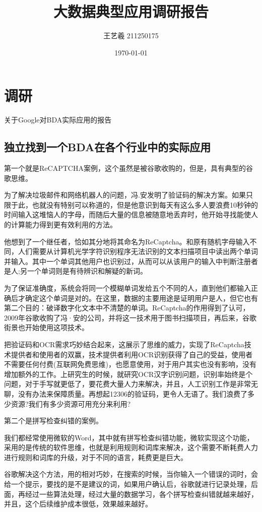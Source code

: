 \documentclass{article}
\title{大数据典型应用调研报告}
\author{王艺羲 211250175}
\date{\today}
\begin{document}
\maketitle

\section{调研}
关于Google对BDA实际应用的报告
\subsection{独立找到一个BDA在各个行业中的实际应用}
第一个就是ReCAPTCHA案例，这个虽然是被谷歌收购的，但是，具有典型的谷歌思维。

为了解决垃圾邮件和网络机器人的问题，冯.安发明了验证码的解决方案。如果只限于此，也就没有特别可以称道的，但是他意识到每天有这么多人要浪费10秒钟的时间输入这堆恼人的字母，而随后大量的信息被随意地丢弃时，他开始寻找能使人的计算能力得到更有效利用的方法。

他想到了一个继任者，恰如其分地将其命名为ReCaptcha。和原有随机字母输入不同，人们需要从计算机光学字符识别程序无法识别的文本扫描项目中读出两个单词并输入。其中一个单词其他用户也识别过，从而可以从该用户的输入中判断注册者是人;另一个单词则是有待辨识和解疑的新词。

为了保证准确度，系统会将同一个模糊单词发给五个不同的人，直到他们都输入正确后才确定这个单词是对的。在这里，数据的主要用途是证明用户是人，但它也有第二个目的：破译数字化文本中不清楚的单词。ReCaptcha的作用得到了认可，2009年谷歌收购了冯·安的公司，并将这一技术用于图书扫描项目，再后来，谷歌街景也开始使用这项技术。

把验证码和OCR需求巧妙结合起来，这展示了思维的威力，实现了ReCaptcha技术提供者和使用者的双赢，技术提供者利用OCR识别获得了自己的受益，使用者不需要任何付费(互联网免费思维)，也愿意使用，对于用户其实也没有影响，没有增加额外的工作。上研究生的时候，就研究OCR汉字识别问题，识别率始终是个问题，对于手写就更低了，要花费大量人力来解决，并且，人工识别工作是非常无聊，没有办法来保障质量。再想起12306的验证码，更令人无语了。我们浪费了多少资源?我们有多少资源可用充分来利用?

第二个是拼写检查纠错的案例。

我们都经常使用微软的Word，其中就有拼写检查纠错功能，微软实现这个功能，采用的是传统的软件思维，也就是利用规则和词库来解决，这个需要不断耗费人力进行规则和词库的升级，对于不同的语言，耗费更是巨大。

谷歌解决这个方法，用的相对巧妙，在搜索的时候，当你输入一个错误的词时，会给一个提示，要找的是不是建议的词，如果用户确认后，谷歌就进行记录处理，后面，再经过一些算法处理，经过大量的数据学习，各个拼写检查纠错就越来越好，并且，这个后续维护成本很低，效果越来越好。
\end{document}
